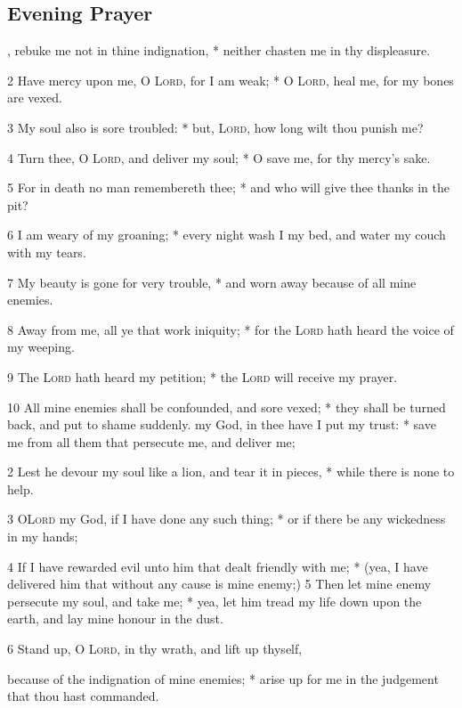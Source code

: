 \subsection{Evening Prayer}
, rebuke me not in thine indignation, * neither chasten me in thy displeasure.\par
2 Have mercy upon me, O {\textsc{Lord}}, for I am weak; * O {\textsc{Lord}}, heal me, for my bones are vexed.\par
3 My soul also is sore troubled: * but, {\textsc{Lord}}, how long wilt thou punish me?\par
4 Turn thee, O {\textsc{Lord}}, and deliver my soul; * O save me, for thy mercy's sake.\par
5 For in death no man remembereth thee; * and who will give thee thanks in the pit?\par
6 I am weary of my groaning; * every night wash I my bed, and water my couch with my tears.\par
7 My beauty is gone for very trouble, * and worn away because of all mine enemies.\par
8 Away from me, all ye that work iniquity; * for the {\textsc{Lord}} hath heard the voice of my weeping.\par
9 The {\textsc{Lord}} hath heard my petition; * the {\textsc{Lord}} will receive my prayer.\par
10 All mine enemies shall be confounded, and sore vexed; * they shall be turned back, and put to shame suddenly.
 my God, in thee have I put my trust: * save me from all them that persecute me, and deliver me;\par
2 Lest he devour my soul like a lion, and tear it in pieces, * while there is none to help.\par
3 O{\textsc{Lord}} my God, if I have done any such thing; * or if there be any wickedness in my hands;\par
4 If I have rewarded evil unto him that dealt friendly with me; * (yea, I have delivered him that without any cause is mine enemy;)
5 Then let mine enemy persecute my soul, and take me; * yea, let him tread my life down upon the earth, and lay mine honour in the dust.\par
6 Stand up, O {\textsc{Lord}}, in thy wrath, and lift up thyself,\par
because of the indignation of mine enemies; * arise up for me in the judgement that thou hast commanded.\par
